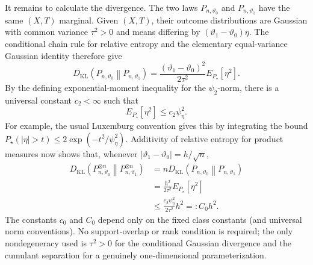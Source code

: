 It remains to calculate the divergence.  The two laws \(P_{n,\vartheta_0}\) and \(P_{n,\vartheta_1}\) have the same \((X,T)\) marginal.  Given \((X,T)\), their outcome distributions are Gaussian with common variance \(\tau^2>0\) and means differing by \((\vartheta_1-\vartheta_0)\eta\).  The conditional chain rule for relative entropy and the elementary equal-variance Gaussian identity therefore give
\[
 D_{\mathrm{KL}}\!\left(P_{n,\vartheta_0}\middle\|P_{n,\vartheta_1}\right)
 =\frac{(\vartheta_1-\vartheta_0)^2}{2\tau^2}
   E_{P_{\star}}[\eta^2].
\]
By the defining exponential-moment inequality for the \(\psi_2\)-norm, there is a universal constant \(c_2<\infty\) such that
\[
 E_{P_{\star}}[\eta^2]\le c_2\psi_{\eta}^2.
\]
For example, the usual Luxemburg convention gives this by integrating the bound \(P_{\star}(|\eta|>t)\le2\exp(-t^2/\psi_{\eta}^2)\).  Additivity of relative entropy for product measures now shows that, whenever \(|\vartheta_1-\vartheta_0|=h/\sqrt n\),
\[
 \begin{aligned}
 D_{\mathrm{KL}}\!\left(P_{n,\vartheta_0}^{\otimes n}
          \middle\|P_{n,\vartheta_1}^{\otimes n}\right)
 &=nD_{\mathrm{KL}}\!\left(P_{n,\vartheta_0}
          \middle\|P_{n,\vartheta_1}\right)\\
 &=\frac{h^2}{2\tau^2}E_{P_{\star}}[\eta^2]\\
 &\le \frac{c_2\psi_{\eta}^2}{2\tau^2}h^2
 =:C_0h^2.
 \end{aligned}
\]
The constants \(c_0\) and \(C_0\) depend only on the fixed class constants (and universal norm conventions).  No support-overlap or rank condition is required; the only nondegeneracy used is \(\tau^2>0\) for the conditional Gaussian divergence and the cumulant separation for a genuinely one-dimensional parameterization.